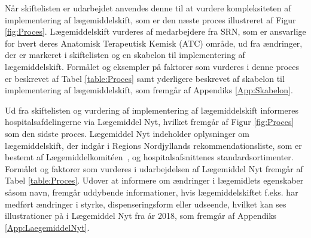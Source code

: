 Når skiftelisten er udarbejdet anvendes denne til at vurdere kompleksiteten af implementering af lægemiddelskift, som er den næste proces illustreret af Figur \ref{fig:Proces}. Lægemiddelskift vurderes af medarbejdere fra SRN, som er ansvarlige for hvert deres Anatomisk Terapeutisk Kemisk (ATC) område, ud fra ændringer, der er markeret i skiftelisten og en skabelon til implementering af lægemiddelskift. Formålet og eksempler på faktorer som vurderes i denne proces er beskrevet af Tabel \ref{table:Proces} samt yderligere beskrevet af skabelon til implementering af lægemiddelskift, som fremgår af Appendiks \ref{App:Skabelon}.

Ud fra skiftelisten og vurdering af implementering af lægemiddelskift informeres hospitalsafdelingerne via Lægemiddel Nyt, hvilket fremgår af Figur \ref{fig:Proces} som den sidste proces. Lægemiddel Nyt indeholder oplysninger om lægemiddelskift, der indgår i Regions Nordjyllands rekommendationsliste, som er bestemt af Lægemiddelkomitéen~\citep{RegionNordjylland2018}, og hospitalsafsnittenes standardsortimenter. Formålet og faktorer som vurderes i udarbejdelsen af Lægemiddel Nyt fremgår af Tabel \ref{table:Proces}. Udover at informere om ændringer i lægemidlets egenskaber såsom navn, fremgår uddybende informationer, hvis lægemiddelskiftet f.eks. har medført ændringer i styrke, dispenseringsform eller udseende, hvilket kan ses illustrationer på i Lægemiddel Nyt fra år 2018, som fremgår af Appendiks \ref{App:LaegemiddelNyt}. 

